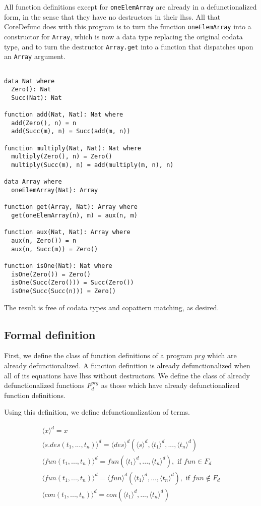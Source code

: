 All function definitions except for \texttt{oneElemArray} are already in a defunctionalized form, in the sense that they have no destructors in their lhss. All that \textsf{CoreDefunc} does with this program is to turn the function \texttt{oneElemArray} into a constructor for \texttt{Array}, which is now a data type replacing the original codata type, and to turn the destructor \texttt{Array.get} into a function that dispatches upon an \texttt{Array} argument.

\begin{lstlisting}

data Nat where
  Zero(): Nat
  Succ(Nat): Nat

function add(Nat, Nat): Nat where
  add(Zero(), n) = n
  add(Succ(m), n) = Succ(add(m, n))

function multiply(Nat, Nat): Nat where
  multiply(Zero(), n) = Zero()
  multiply(Succ(m), n) = add(multiply(m, n), n)

data Array where
  oneElemArray(Nat): Array

function get(Array, Nat): Array where
  get(oneElemArray(n), m) = aux(n, m)

function aux(Nat, Nat): Array where
  aux(n, Zero()) = n
  aux(n, Succ(m)) = Zero()

function isOne(Nat): Nat where
  isOne(Zero()) = Zero()
  isOne(Succ(Zero())) = Succ(Zero())
  isOne(Succ(Succ(n))) = Zero()

\end{lstlisting}

The result is free of codata types and copattern matching, as desired.

\subsection{Formal definition}

First, we define the class of function definitions of a program $prg$ which are already defunctionalized. A function definition is already defunctionalized when all of its equations have lhss without destructors. We define the class of already defunctionalized functions $F^{prg}_d$ as those which have already defunctionalized function definitions.

Using this definition, we define defunctionalization of terms.

\begin{align*}
\langle x \rangle^d = x \\
\langle s.des(t_1, ..., t_n) \rangle^d = \langle des \rangle^d (\langle s \rangle^d, \langle t_1 \rangle^d, ..., \langle t_n \rangle^d) \\
\langle fun(t_1, ..., t_n) \rangle^d = fun(\langle t_1 \rangle^d, ..., \langle t_n \rangle^d), \text{ if } fun \in F_d \\
\langle fun(t_1, ..., t_n) \rangle^d = \langle fun \rangle^d (\langle t_1 \rangle^d, ..., \langle t_n \rangle^d), \text{ if } fun \not\in F_d \\
\langle con(t_1, ..., t_n) \rangle^d = con(\langle t_1 \rangle^d, ..., \langle t_n \rangle^d)
\end{align*}

